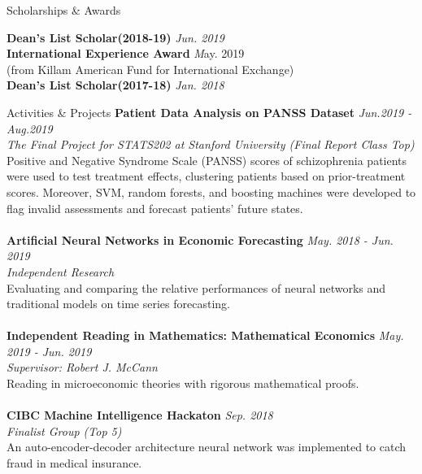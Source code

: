 \documentclass{resume} %
\begin{document}
\begin{rSection}{Scholarships \& Awards}

{\bf Dean's List Scholar(2018-19)} \hfill {\em Jun. 2019}
\\ {\bf International Experience Award} \hfill{\emph May. 2019}
\\ (from Killam American Fund for International Exchange)
\\ {\bf Dean's List Scholar(2017-18)} \hfill {\em Jan. 2018}
\end{rSection}
\begin{rSection}{Activities \& Projects}
{\bf Patient Data Analysis on PANSS Dataset} \hfill \emph{Jun.2019 - Aug.2019}
\\ \emph{The Final Project for STATS202 at Stanford University (Final Report Class Top)}
\\Positive and Negative Syndrome Scale (PANSS) scores of schizophrenia patients were used to test treatment effects, clustering patients based on prior-treatment scores. Moreover, SVM, random forests, and boosting machines were developed to flag invalid assessments and forecast patients' future states.
\\
\\{\bf Artificial Neural Networks in Economic Forecasting} \hfill \emph{May. 2018 - Jun. 2019}
\\ \emph{Independent Research}
\\ Evaluating and comparing the relative performances of neural networks and traditional models on time series forecasting.
\\
\\{\bf Independent Reading in Mathematics: Mathematical Economics} \hfill \emph{May. 2019 - Jun. 2019}
\\ \emph{Supervisor: Robert J. McCann}
\\ Reading in microeconomic theories with rigorous mathematical proofs.
\\
\\{\bf CIBC Machine Intelligence Hackaton} \hfill \emph{Sep. 2018}
\\ \emph{Finalist Group (Top 5)}
\\ An auto-encoder-decoder architecture neural network was implemented to catch fraud in medical insurance.
\end{rSection}
\end{document}

